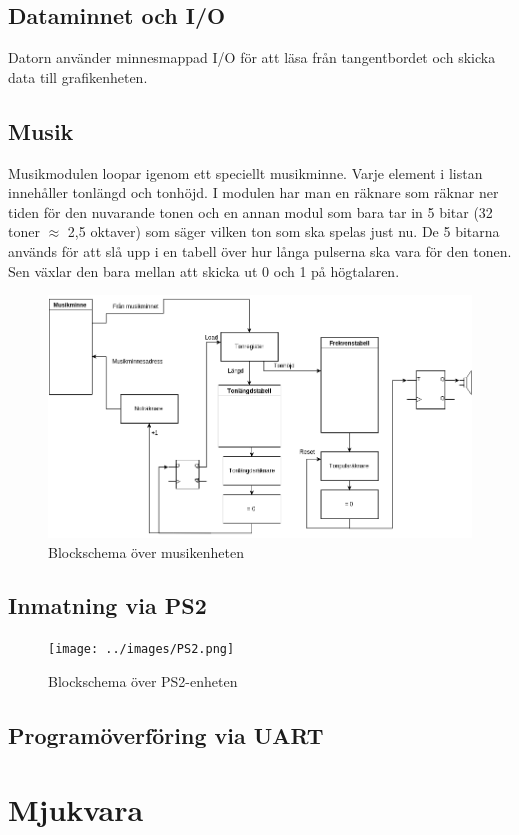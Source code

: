 \documentclass[a4paper,titlepage]{article}
\begin{document}
\subsection{Dataminnet och I/O}

Datorn använder minnesmappad I/O för att läsa från tangentbordet och skicka data
till grafik\-enheten.


\subsection{Musik}

Musikmodulen loopar igenom ett speciellt musikminne. Varje element i listan
innehåller tonlängd och tonhöjd. I modulen har man en räknare som räknar ner
tiden för den nuvarande tonen och en annan modul som bara tar in 5 bitar (32
toner $\approx$ 2,5 oktaver) som säger vilken ton som ska spelas just nu. De 5
bitarna används för att slå upp i en tabell över hur långa pulserna ska vara för
den tonen. Sen växlar den bara mellan att skicka ut 0 och 1 på högtalaren.

\begin{figure}[H]
	\centering
\includegraphics[width=14cm]{../images/Musik.png}
	\caption{Blockschema över musikenheten}
\end{figure}

\subsection{Inmatning via PS2}

\begin{figure}[H]
	\centering
\texttt{[image: ../images/PS2.png]}
	\caption{Blockschema över PS2-enheten}
\end{figure}

\subsection{Programöverföring via UART}

\section{Mjukvara}
\end{document}
